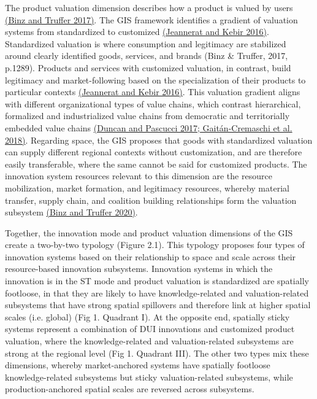 \documentclass[twoside,12pt,final]{ucthesis-CA2012}
\begin{document}
\begin{ucmainmatter}
The product valuation dimension describes how a product is valued by
users \href{https://www.zotero.org/google-docs/?WdhxCQ}{(Binz and Truffer
2017)}. The GIS framework
identifies a gradient of valuation systems from standardized to
customized \href{https://www.zotero.org/google-docs/?Nm2Lhv}{(Jeannerat and Kebir
2016)}. Standardized
valuation is where \textquotesingle consumption and legitimacy are stabilized around
clearly identified goods, services, and brands\textquotesingle{} (Binz \& Truffer, 2017,
p.1289). Products and services with customized valuation, in contrast,
build legitimacy and market-following based on the specialization of
their products to particular contexts \href{https://www.zotero.org/google-docs/?gTPKm2}{(Jeannerat and Kebir
2016)}. This valuation
gradient aligns with different organizational types of value chains,
which contrast hierarchical, formalized and industrialized value chains
from democratic and territorially embedded value chains \href{https://www.zotero.org/google-docs/?UQzBFq}{(Duncan and
Pascucci 2017; Gaitán-Cremaschi et al.
2018)}. Regarding space, the
GIS proposes that goods with standardized valuation can supply different
regional contexts without customization, and are therefore easily
transferable, where the same cannot be said for customized products. The
innovation system resources relevant to this dimension are the resource
mobilization, market formation, and legitimacy resources, whereby
material transfer, supply chain, and coalition building relationships
form the \textquotesingle valuation subsystem\textquotesingle{} \href{https://www.zotero.org/google-docs/?7zOOi5}{(Binz and Truffer
2020)}.

Together, the innovation mode and product valuation dimensions of the
GIS create a two-by-two typology (Figure 2.1). This typology proposes
four types of innovation systems based on their relationship to space
and scale across their resource-based innovation subsystems. Innovation
systems in which the innovation is in the ST mode and product valuation
is standardized are \textquotesingle spatially footloose\textquotesingle, in that they are likely to
have knowledge-related and valuation-related subsystems that have strong
spatial spillovers and therefore link at higher spatial scales (i.e.
\textquotesingle global\textquotesingle) (Fig 1. Quadrant I). At the opposite end, \textquotesingle spatially
sticky\textquotesingle{} systems represent a combination of DUI innovations and
customized product valuation, where the knowledge-related and
valuation-related subsystems are strong at the regional level (Fig 1.
Quadrant III). The other two types mix these dimensions, whereby
\textquotesingle market-anchored\textquotesingle{} systems have spatially footloose knowledge-related
subsystems but sticky valuation-related subsystems, while
\textquotesingle production-anchored\textquotesingle{} spatial scales are reversed across subsystems.


\end{ucmainmatter}
\end{document}
